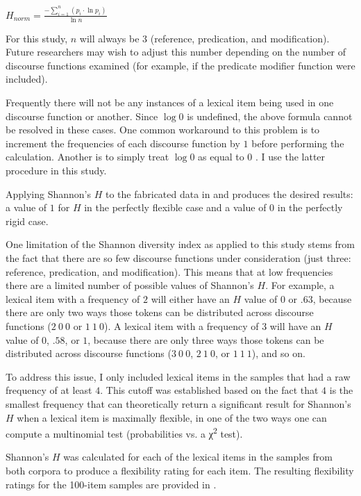 \begin{exe}
  \ex\label{ex:Shannon-H}
  $H_{norm} = \displaystyle\frac{-\displaystyle\sum_{i = 1}^{n}(p_i \cdot \ln p_i)}{\ln n}$
\end{exe}

\noindent For this study, $n$ will always be $3$ (reference, predication, and modification). Future researchers may wish to adjust this number depending on the number of discourse functions examined (for example, if the predicate modifier function were included).

Frequently there will not be any instances of a lexical item being used in one discourse function or another. Since $\log 0$ is undefined, the above formula cannot be resolved in these cases. One common workaround to this problem is to increment the frequencies of each discourse function by $1$ before performing the calculation. Another is to simply treat $\log 0$ as equal to $0$ \parencite[120--121]{Gries2013}. I use the latter procedure in this study.

Applying Shannon's $H$ to the fabricated data in  and  produces the desired results: a value of $1$ for $H$ in the perfectly flexible case and a value of $0$ in the perfectly rigid case.

One limitation of the Shannon diversity index as applied to this study stems from the fact that there are so few discourse functions under consideration (just three: reference, predication, and modification). This means that at low frequencies there are a limited number of possible values of Shannon's $H$. For example, a lexical item with a frequency of $2$ will either have an $H$ value of $0$ or $.63$, because there are only two ways those tokens can be distributed across discourse functions ($2\ 0\ 0$ or $1\ 1\ 0$). A lexical item with a frequency of $3$ will have an $H$ value of $0$, $.58$, or $1$, because there are only three ways those tokens can be distributed across discourse functions ($3\ 0\ 0$, $2\ 1\ 0$, or $1\ 1\ 1$), and so on.

To address this issue, I only included lexical items in the samples that had a raw frequency of at least $4$. This cutoff was established based on the fact that $4$ is the smallest frequency that can theoretically return a significant result for Shannon's $H$ when a lexical item is maximally flexible, in one of the two ways one can compute a multinomial test (probabilities vs. a χ\textsuperscript{2} test).

Shannon's $H$ was calculated for each of the lexical items in the samples from both corpora to produce a flexibility rating for each item. The resulting flexibility ratings for the 100-item samples are provided in .

